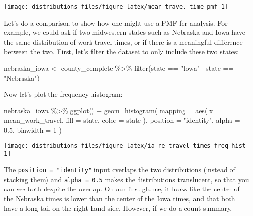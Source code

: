 \documentclass[
]{book}
\newenvironment{Shaded}{\begin{snugshade}}{\end{snugshade}}
\newcommand{\AttributeTok}[1]{\textcolor[rgb]{0.77,0.63,0.00}{#1}}
\newcommand{\DecValTok}[1]{\textcolor[rgb]{0.00,0.00,0.81}{#1}}
\newcommand{\FloatTok}[1]{\textcolor[rgb]{0.00,0.00,0.81}{#1}}
\newcommand{\FunctionTok}[1]{\textcolor[rgb]{0.00,0.00,0.00}{#1}}
\newcommand{\NormalTok}[1]{#1}
\newcommand{\OtherTok}[1]{\textcolor[rgb]{0.56,0.35,0.01}{#1}}
\newcommand{\SpecialCharTok}[1]{\textcolor[rgb]{0.00,0.00,0.00}{#1}}
\newcommand{\StringTok}[1]{\textcolor[rgb]{0.31,0.60,0.02}{#1}}
\begin{document}
\begin{center}\texttt{[image: distributions\_files/figure-latex/mean-travel-time-pmf-1]} \end{center}

Let's do a comparison to show how one might use a PMF for analysis.
For example, we could ask if two midwestern states such as Nebraska and Iowa have the same distribution of work travel times, or if there is a meaningful difference between the two.
First, let's filter the dataset to only include these two states:

\begin{Shaded}
\begin{Highlighting}[]
\NormalTok{nebraska\_iowa }\OtherTok{\textless{}{-}}\NormalTok{ county\_complete }\SpecialCharTok{\%\textgreater{}\%}
  \FunctionTok{filter}\NormalTok{(state }\SpecialCharTok{==} \StringTok{"Iowa"} \SpecialCharTok{|}\NormalTok{ state }\SpecialCharTok{==} \StringTok{"Nebraska"}\NormalTok{)}
\end{Highlighting}
\end{Shaded}

Now let's plot the frequency histogram:

\begin{Shaded}
\begin{Highlighting}[]
\NormalTok{nebraska\_iowa }\SpecialCharTok{\%\textgreater{}\%}
  \FunctionTok{ggplot}\NormalTok{() }\SpecialCharTok{+}
  \FunctionTok{geom\_histogram}\NormalTok{(}
    \AttributeTok{mapping =} \FunctionTok{aes}\NormalTok{(}
      \AttributeTok{x =}\NormalTok{ mean\_work\_travel,}
      \AttributeTok{fill =}\NormalTok{ state,}
      \AttributeTok{color =}\NormalTok{ state}
\NormalTok{    ),}
    \AttributeTok{position =} \StringTok{"identity"}\NormalTok{,}
    \AttributeTok{alpha =} \FloatTok{0.5}\NormalTok{,}
    \AttributeTok{binwidth =} \DecValTok{1}
\NormalTok{  )}
\end{Highlighting}
\end{Shaded}

\begin{center}\texttt{[image: distributions\_files/figure-latex/ia-ne-travel-times-freq-hist-1]} \end{center}

The \texttt{position\ =\ "identity"} input overlaps the two distributions (instead of stacking them) and \texttt{alpha\ =\ 0.5} makes the distributions translucent, so that you can see both despite the overlap.
On our first glance, it looks like the center of the Nebraska times is lower than the center of the Iowa times, and that both have a long tail on the right-hand side.
However, if we do a count summary,
\end{document}
